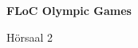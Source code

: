 \documentclass[a4paper]{article}
\begin{document}
\printGenericVSLHeader
\begin{center}
\begin{vsltext}{3cm}{4cm}

   \vspace{0.5cm} 

    \textbf{FLoC Olympic Games} 

    \vspace{1.5cm}

    Hörsaal 2

\end{vsltext}

\end{center}
\end{document}
